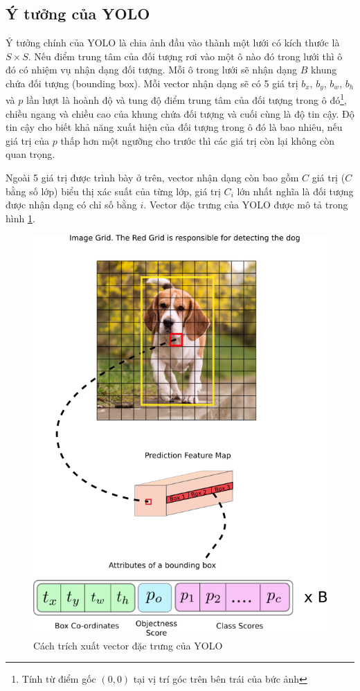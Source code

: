\documentclass[../thesis.tex]{subfiles}
\begin{document}
\subsection{Ý tưởng của YOLO}

Ý tưởng chính của YOLO là chia ảnh đầu vào thành một lưới có kích thước là $S \times S$. Nếu điểm trung tâm của đối tượng rơi vào một ô nào đó trong lưới thì ô đó có nhiệm vụ nhận dạng đối tượng. Mỗi ô trong lưới sẽ nhận dạng $B$ khung chứa đối tượng (bounding box). Mỗi vector nhận dạng sẽ có 5 giá trị $b_x$, $b_y$, $b_w$, $b_h$ và $p$ lần lượt là hoành độ và tung độ điểm trung tâm của đối tượng trong ô đó\footnote{Tính từ điểm gốc $(0, 0)$ tại vị trí góc trên bên trái của bức ảnh}, chiều ngang và chiều cao của khung chứa đối tượng và cuối cùng là độ tin cậy. Độ tin cậy cho biết khả năng xuất hiện của đối tượng trong ô đó là bao nhiêu, nếu giá trị của $p$ thấp hơn một ngưỡng cho trước thì các giá trị còn lại không còn quan trọng.

Ngoài 5 giá trị được trình bày ở trên, vector nhận dạng còn bao gồm $C$ giá trị ($C$ bằng số lớp) biểu thị xác suất của từng lớp, giá trị $C_i$ lớn nhất nghĩa là đối tượng được nhận dạng có chỉ số bằng $i$. Vector đặc trưng của YOLO được mô tả trong hình \ref{yolo_feature_map}.

\begin{figure}[H]
    \centering
    \includegraphics[width=0.9\linewidth]{images/yolo-feature-map.png}
    \caption{Cách trích xuất vector đặc trưng của YOLO \cite{yolov3-pytorch-tutorial}}
    \label{yolo_feature_map}
\end{figure}
\end{document}
